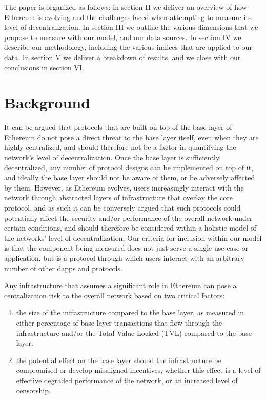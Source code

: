 \documentclass[conference]{IEEEtran}
\begin{document}
The paper is organized as follows: in section II we deliver an overview of how Ethereum is evolving and the challenges faced when attempting to measure its level of decentralization.  In section III we outline the various dimensions that we propose to measure with our model, and our data sources.  In section IV we describe our methodology, including the various indices that are applied to our data.  In section V we deliver a breakdown of results, and we close with our conclusions in section VI.

\section{Background}

It can be argued that protocols that are built on top of the base layer of Ethereum do not pose a direct threat to the base layer itself, even when they are highly centralized, and should therefore not be a factor in quantifying the network's level of decentralization.  Once the base layer is sufficiently decentralized, any number of protocol designs can be implemented on top of it, and ideally the base layer should not be aware of them, or be adversely affected by them.  However, as Ethereum evolves, users increasingly interact with the network through abstracted layers of infrastructure that overlay the core protocol, and as such it can be conversely argued that such protocols could potentially affect the security and/or performance of the overall network under certain conditions, and should therefore be considered within a holistic model of the networks' level of decentralization.   Our criteria for inclusion within our model is that the component being measured does not just serve a single use case or application, but is a protocol through which users interact with an arbitrary number of other dapps and protocols.

Any infrastructure that assumes a significant role in Ethereum can pose a centralization risk to the overall network based on two critical factors:
\begin{enumerate}[label=\alph*.]
\item the size of the infrastructure compared to the base layer, as measured in either percentage of base layer transactions that flow through the infrastructure and/or the Total Value Locked (TVL) compared to the base layer.
\item the potential effect on the base layer should the infrastructure be compromised or develop misaligned incentives, whether this effect is a level of effective degraded performance of the network, or an increased level of censorship.
\end{enumerate}
\end{document}
